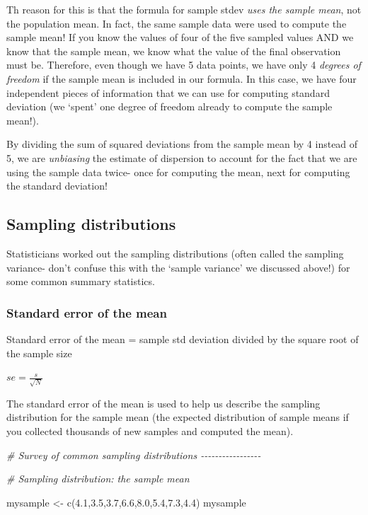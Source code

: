 \documentclass[
]{article}
\newenvironment{Shaded}{\begin{snugshade}}{\end{snugshade}}
\newcommand{\CommentTok}[1]{\textcolor[rgb]{0.56,0.35,0.01}{\textit{#1}}}
\newcommand{\FloatTok}[1]{\textcolor[rgb]{0.00,0.00,0.81}{#1}}
\newcommand{\FunctionTok}[1]{\textcolor[rgb]{0.00,0.00,0.00}{#1}}
\newcommand{\NormalTok}[1]{#1}
\newcommand{\OtherTok}[1]{\textcolor[rgb]{0.56,0.35,0.01}{#1}}
\begin{document}
Th reason for this is that the formula for sample stdev \emph{uses the
sample mean}, not the population mean. In fact, the same sample data
were used to compute the sample mean! If you know the values of four of
the five sampled values AND we know that the sample mean, we know what
the value of the final observation must be. Therefore, even though we
have 5 data points, we have only 4 \emph{degrees of freedom} if the
sample mean is included in our formula. In this case, we have four
independent pieces of information that we can use for computing standard
deviation (we `spent' one degree of freedom already to compute the
sample mean!).

By dividing the sum of squared deviations from the sample mean by 4
instead of 5, we are \emph{unbiasing} the estimate of dispersion to
account for the fact that we are using the sample data twice- once for
computing the mean, next for computing the standard deviation!

\hypertarget{sampling-distributions}{%
\subsection{Sampling distributions}\label{sampling-distributions}}

Statisticians worked out the sampling distributions (often called the
sampling variance- don't confuse this with the `sample variance' we
discussed above!) for some common summary statistics.

\hypertarget{standard-error-of-the-mean}{%
\subsubsection{Standard error of the
mean}\label{standard-error-of-the-mean}}

Standard error of the mean = sample std deviation divided by the square
root of the sample size

\(se = \frac{s}{\sqrt{N}}\)

The standard error of the mean is used to help us describe the sampling
distribution for the sample mean (the expected distribution of sample
means if you collected thousands of new samples and computed the mean).

\begin{Shaded}
\begin{Highlighting}[]
\CommentTok{\# Survey of common sampling distributions {-}{-}{-}{-}{-}{-}{-}{-}{-}{-}{-}{-}{-}{-}{-}{-}{-}}

\CommentTok{\# Sampling distribution: the sample mean}

\NormalTok{mysample }\OtherTok{\textless{}{-}} \FunctionTok{c}\NormalTok{(}\FloatTok{4.1}\NormalTok{,}\FloatTok{3.5}\NormalTok{,}\FloatTok{3.7}\NormalTok{,}\FloatTok{6.6}\NormalTok{,}\FloatTok{8.0}\NormalTok{,}\FloatTok{5.4}\NormalTok{,}\FloatTok{7.3}\NormalTok{,}\FloatTok{4.4}\NormalTok{)}
\NormalTok{mysample}
\end{Highlighting}
\end{Shaded}
\end{document}
